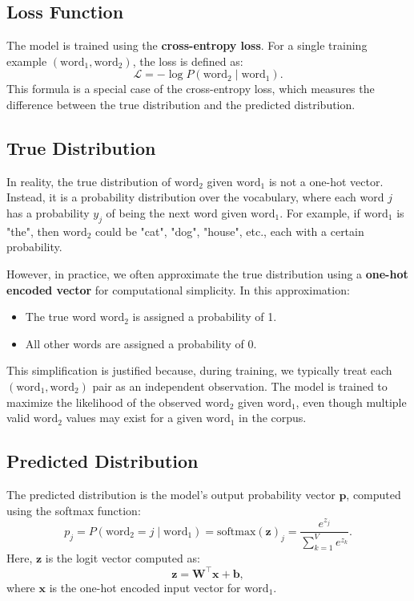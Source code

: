 \begin{notechapter}
\section{Loss Function}
The model is trained using the \textbf{cross-entropy loss}. For a single
training example \((\text{word}_1, \text{word}_2)\), the loss is defined as:
\[
\mathcal{L} = -\log P(\text{word}_2 \mid \text{word}_1).
\]
This formula is a special case of the cross-entropy loss, which measures
the difference between the true distribution and the predicted distribution.

\subsection{True Distribution}
In reality, the true distribution of \(\text{word}_2\) given \(\text{word}_1\)
is not a one-hot vector. Instead, it is a probability distribution over the
vocabulary, where each word \(j\) has a probability \(y_j\) of being the next
word given \(\text{word}_1\). For example, if \(\text{word}_1\) is "the", then
\(\text{word}_2\) could be "cat", "dog", "house", etc., each with a certain
probability.

However, in practice, we often approximate the true distribution using a
\textbf{one-hot encoded vector} for computational simplicity. In this
approximation:
\begin{itemize}
    \item The true word \(\text{word}_2\) is assigned a probability of 1.
    \item All other words are assigned a probability of 0.
\end{itemize}

This simplification is justified because, during training, we typically treat
each \((\text{word}_1, \text{word}_2)\) pair as an independent observation.
The model is trained to maximize the likelihood of the observed \(\text{word}_2\)
given \(\text{word}_1\), even though multiple valid \(\text{word}_2\) values
may exist for a given \(\text{word}_1\) in the corpus.

\subsection{Predicted Distribution}
The predicted distribution is the model's output probability vector
\(\mathbf{p}\), computed using the softmax function:
\[
p_j = P(\text{word}_2 = j \mid \text{word}_1) =
\text{softmax}(\mathbf{z})_j = \frac{e^{z_j}}{\sum_{k=1}^V e^{z_k}}.
\]
Here, \(\mathbf{z}\) is the logit vector computed as:
\[
\mathbf{z} = \mathbf{W}^\top \mathbf{x} + \mathbf{b},
\]
where \(\mathbf{x}\) is the one-hot encoded input vector for \(\text{word}_1\).


\end{notechapter}
